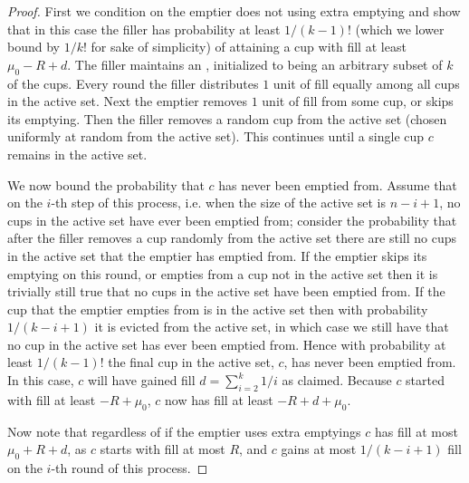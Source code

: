 \begin{proof}
  First we condition on the emptier does not using extra emptying
  and show that in this case the filler has probability at least
  $1/(k-1)!$ (which we lower bound by $1/k!$ for sake of
  simplicity) of attaining a cup with fill at least $\mu_0 -R +d$.
  The filler maintains an , initialized to being
  an arbitrary subset of $k$ of the cups. Every round the filler
  distributes $1$ unit of fill equally among all cups in the
  active set. Next the emptier removes $1$ unit of fill from some
  cup, or skips its emptying. Then the filler removes a random
  cup from the active set (chosen uniformly at random from the
  active set). This continues until a single cup $c$ remains in
  the active set. 

  We now bound the probability that $c$ has never been emptied
  from. Assume that on the $i$-th step of this process, i.e. when
  the size of the active set is $n-i+1$, no cups in the active
  set have ever been emptied from; consider the probability that
  after the filler removes a cup randomly from the active set
  there are still no cups in the active set that the emptier has
  emptied from. If the emptier skips its emptying on this round,
  or empties from a cup not in the active set then it is
  trivially still true that no cups in the active set have been
  emptied from. If the cup that the emptier empties from is in
  the active set then with probability $1/(k-i+1)$ it is evicted
  from the active set, in which case we still have that no
  cup in the active set has ever been emptied from. Hence with
  probability at least $1/(k-1)!$ the final cup in the
  active set, $c$, has never been emptied from. In this case, $c$
  will have gained fill $d=\sum_{i=2}^k 1/i$ as claimed. Because
  $c$ started with fill at least $-R+\mu_0$, $c$ now has fill at
  least $-R+ d+\mu_0$. 

  Now note that regardless of if the emptier uses extra emptyings
  $c$ has fill at most $\mu_0 + R + d$, as $c$ starts with fill
  at most $R$, and $c$ gains at most $1/(k-i+1)$ fill on the
  $i$-th round of this process. 


\end{proof}
